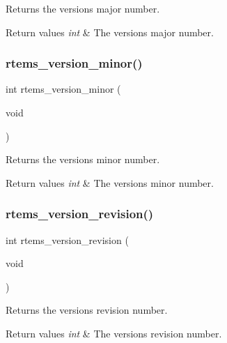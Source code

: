 Returns the version\textquotesingle{}s major number. 


\begin{DoxyRetVals}{Return values}
{\em int} & The version\textquotesingle{}s major number. \\
\hline
\end{DoxyRetVals}
\mbox{\label{group__RTEMSAPIClassicVersion_ga8bb5b05eaf8e6d8b8aaa3138640c4fb9}} 
\subsubsection{\texorpdfstring{rtems\_version\_minor()}{rtems\_version\_minor()}}
{\footnotesize\ttfamily int rtems\+\_\+version\+\_\+minor (\begin{DoxyParamCaption}\item[{void}]{ }\end{DoxyParamCaption})}



Returns the version\textquotesingle{}s minor number. 


\begin{DoxyRetVals}{Return values}
{\em int} & The version\textquotesingle{}s minor number. \\
\hline
\end{DoxyRetVals}
\mbox{\label{group__RTEMSAPIClassicVersion_ga29c105b01e8444e19e43588ed1a55a52}} 
\subsubsection{\texorpdfstring{rtems\_version\_revision()}{rtems\_version\_revision()}}
{\footnotesize\ttfamily int rtems\+\_\+version\+\_\+revision (\begin{DoxyParamCaption}\item[{void}]{ }\end{DoxyParamCaption})}



Returns the version\textquotesingle{}s revision number. 


\begin{DoxyRetVals}{Return values}
{\em int} & The version\textquotesingle{}s revision number. \\
\hline
\end{DoxyRetVals}
